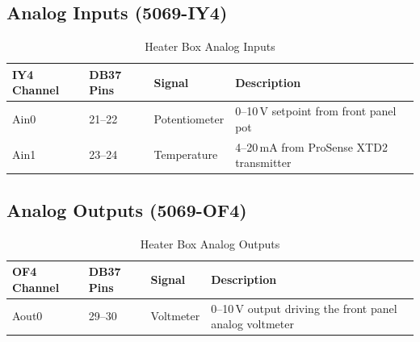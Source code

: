 \documentclass[main.tex]{subfiles}
\begin{document}
\subsection{Analog Inputs (5069-IY4)}

\begin{table}[H]
\centering
\caption{Heater Box Analog Inputs}
\label{tab:heater-ain}
\begin{tabularx}{\textwidth}{l l l X}
\hline
\textbf{IY4 Channel} & \textbf{DB37 Pins} & \textbf{Signal} & \textbf{Description} \\
\hline
Ain0 & 21--22 & Potentiometer & 0--10\,V setpoint from front panel pot \\
Ain1 & 23--24 & Temperature & 4--20\,mA from ProSense XTD2 transmitter \\

\hline
\end{tabularx}
\end{table}

\subsection{Analog Outputs (5069-OF4)}

\begin{table}[H]
\centering
\caption{Heater Box Analog Outputs}
\label{tab:heater-aout}
\begin{tabularx}{\textwidth}{l l l X}
\hline
\textbf{OF4 Channel} & \textbf{DB37 Pins} & \textbf{Signal} & \textbf{Description} \\
\hline
Aout0 & 29--30 & Voltmeter & 0--10\,V output driving the front panel analog voltmeter \\
\hline
\end{tabularx}
\end{table}
\end{document}
